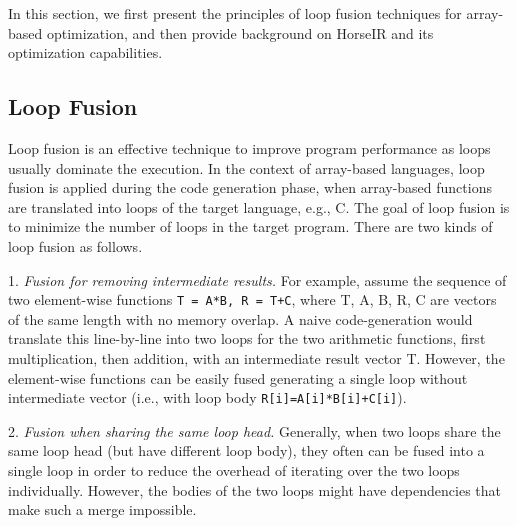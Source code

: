 
In this section, we first present the principles of loop fusion techniques for
array-based optimization, and then provide background on HorseIR and its
optimization capabilities. 

\subsection{Loop Fusion}

Loop fusion is an effective technique to improve program performance as
loops usually dominate the execution.
In the context of array-based languages, loop fusion is applied during the code
generation phase, when array-based functions are translated into loops of the
target language, e.g., C. The goal of loop fusion is to minimize the number of
loops in the target program.
There are two kinds of loop fusion as follows.

1. \textit{Fusion for removing intermediate results.}
For example, assume the sequence of two element-wise functions
\texttt{T = A*B, R = T+C}, where T, A, B, R, C are vectors of the same length
with no memory overlap.
A naive code-generation would translate this line-by-line into two loops for
the two arithmetic functions, first multiplication, then addition, with an
intermediate result vector T.
However, the element-wise functions can be easily fused generating a single
loop without intermediate vector (i.e., with loop body \texttt{R[i]=A[i]*B[i]+C[i]}).

2. \textit{Fusion when sharing the same loop head.}
Generally, when two loops share the same loop head (but have different loop
body), they often can be fused into a single loop in order to reduce the
overhead of iterating over the two loops individually. However, the bodies of
the two loops might have dependencies that make such a merge impossible. 



